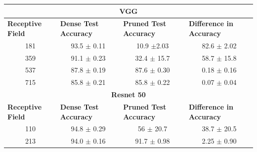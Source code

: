 \begin{table}[H]
\begin{tabular}{@{}cccc@{}}
\toprule
\multicolumn{4}{c}{\textbf{VGG}}                                                                                                                                                                          \\ \midrule
\multicolumn{1}{l}{\textbf{Receptive Field}} & \multicolumn{1}{l}{\textbf{Dense Test Accuracy}} & \multicolumn{1}{l}{\textbf{Pruned Test Accuracy}} & \multicolumn{1}{l}{\textbf{Difference in Accuracy}} \\
181                                          & 93.5 $\pm$ 0.11                                  & 10.9 $\pm$2.03                                    & 82.6 $\pm$ 2.02                                     \\
359                                          & 91.1 $\pm$ 0.23                                  & 32.4 $\pm$ 15.7                                   & 58.7 $\pm$ 15.8                                     \\
537                                          & 87.8 $\pm$ 0.19                                  & 87.6 $\pm$ 0.30                                   & 0.18 $\pm$ 0.16                                     \\
715                                          & 85.8 $\pm$ 0.21                                  & 85.8 $\pm$ 0.22                                   & 0.07 $\pm$ 0.04                                     \\ \midrule
\multicolumn{4}{c}{\textbf{Resnet 50}}                                                                                                                                                                    \\ \midrule
\multicolumn{1}{l}{\textbf{Receptive Field}} & \multicolumn{1}{l}{\textbf{Dense Test Accuracy}} & \multicolumn{1}{l}{\textbf{Pruned Test Accuracy}} & \multicolumn{1}{l}{\textbf{Difference in Accuracy}} \\
110                                          & 94.8 $\pm$ 0.29                                  & 56 $\pm$ 20.7                                     & 38.7 $\pm$ 20.5                                     \\
213                                          & 94.0 $\pm$ 0.16                                  & 91.7 $\pm$ 0.98                                   & 2.25 $\pm$ 0.90                                     \\

\end{tabular}
\end{table}
